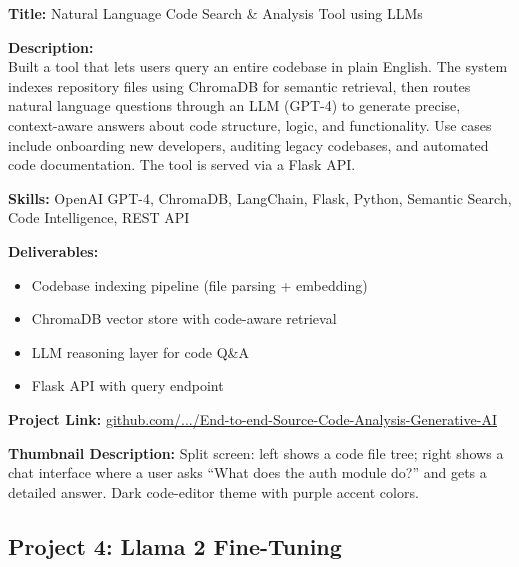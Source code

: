 \documentclass[11pt,a4paper]{article}
\newcommand{\projectentry}[1]{%
  \begin{mdframed}[backgroundcolor=LightGray, linecolor=VividPurple, linewidth=1pt,
    topline=false, bottomline=false, rightline=false,
    innerleftmargin=10pt, innerrightmargin=10pt, innertopmargin=8pt, innerbottommargin=8pt,
    skipabove=8pt, skipbelow=4pt]
  #1
  \end{mdframed}
}
\begin{document}
\projectentry{
\textbf{\textcolor{VividPurple}{Title:}} Natural Language Code Search \& Analysis Tool using LLMs

\medskip
\textbf{\textcolor{VividPurple}{Description:}}\\
Built a tool that lets users query an entire codebase in plain English. The system indexes repository files using ChromaDB for semantic retrieval, then routes natural language questions through an LLM (GPT-4) to generate precise, context-aware answers about code structure, logic, and functionality. Use cases include onboarding new developers, auditing legacy codebases, and automated code documentation. The tool is served via a Flask API.

\medskip
\textbf{\textcolor{VividPurple}{Skills:}} OpenAI GPT-4, ChromaDB, LangChain, Flask, Python, Semantic Search, Code Intelligence, REST API

\medskip
\textbf{\textcolor{VividPurple}{Deliverables:}}
\begin{itemize}
  \item Codebase indexing pipeline (file parsing + embedding)
  \item ChromaDB vector store with code-aware retrieval
  \item LLM reasoning layer for code Q\&A
  \item Flask API with query endpoint
\end{itemize}

\textbf{\textcolor{VividPurple}{Project Link:}} \href{https://github.com/adebanjioluwatimileyin/generative-ai-portfolio/blob/main/End-to-End-AI-Applications/End-to-end-Source-Code-Analysis-Generative-AI}{github.com/.../End-to-end-Source-Code-Analysis-Generative-AI}

\medskip
\textbf{\textcolor{VividPurple}{Thumbnail Description:}} Split screen: left shows a code file tree; right shows a chat interface where a user asks ``What does the auth module do?'' and gets a detailed answer. Dark code-editor theme with purple accent colors.
}

\subsection{Project 4: Llama 2 Fine-Tuning}
\end{document}
